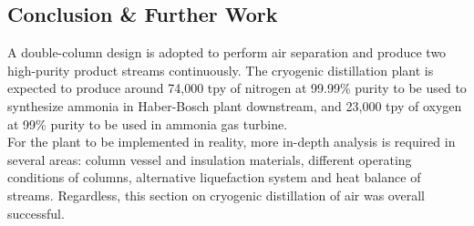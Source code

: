 \subsection{Conclusion \& Further Work}
\noindent A double-column design is adopted to perform air separation and produce two high-purity product streams continuously. The cryogenic distillation plant is expected to produce around 74,000 tpy of nitrogen at 99.99\% purity to be used to synthesize ammonia in Haber-Bosch plant downstream, and 23,000 tpy of oxygen at 99\% purity to be used in ammonia gas turbine. \\
For the plant to be implemented in reality, more in-depth analysis is required in several areas: column vessel and insulation materials, different operating conditions of columns, alternative liquefaction system and heat balance of streams. Regardless, this section on cryogenic distillation of air was overall successful.


%


%